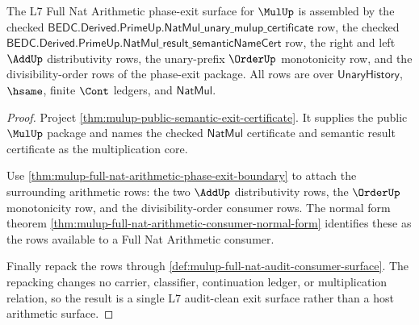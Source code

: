 \begin{theorem}
\label{thm:mulup-l7-audit-clean-exit-surface}
The L7 Full Nat Arithmetic phase-exit surface for $\MulUp$ is assembled by the
checked $\mathsf{BEDC.Derived.PrimeUp.NatMul\_unary\_mulup\_certificate}$ row,
the checked
$\mathsf{BEDC.Derived.PrimeUp.NatMul\_result\_semanticNameCert}$ row, the
right and left $\AddUp$ distributivity rows, the unary-prefix $\OrderUp$
monotonicity row, and the divisibility-order rows of the phase-exit package.
All rows are over $\mathsf{UnaryHistory}$, $\hsame$, finite $\Cont$ ledgers,
and $\mathsf{NatMul}$.
\end{theorem}
\begin{proof}
Project \autoref{thm:mulup-public-semantic-exit-certificate}. It supplies the
public $\MulUp$ package and names the checked $\mathsf{NatMul}$ certificate and
semantic result certificate as the multiplication core.

Use \autoref{thm:mulup-full-nat-arithmetic-phase-exit-boundary} to attach the
surrounding arithmetic rows: the two $\AddUp$ distributivity rows, the
$\OrderUp$ monotonicity row, and the divisibility-order consumer rows. The
normal form theorem \autoref{thm:mulup-full-nat-arithmetic-consumer-normal-form}
identifies these as the rows available to a Full Nat Arithmetic consumer.

Finally repack the rows through
\autoref{def:mulup-full-nat-audit-consumer-surface}. The repacking changes no
carrier, classifier, continuation ledger, or multiplication relation, so the
result is a single L7 audit-clean exit surface rather than a host arithmetic
surface.
\end{proof}
